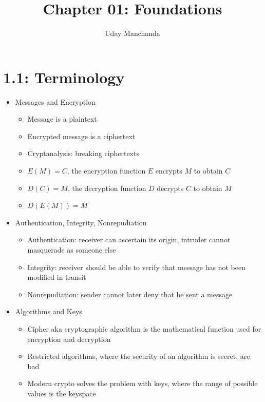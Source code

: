 \documentclass[]{article}
\title{Chapter 01: Foundations}
\author{Uday Manchanda}
\begin{document}
\maketitle

\begin{abstract}
\end{abstract}

\section{1.1: Terminology}
\begin{itemize}
    \item Messages and Encryption
    \begin{itemize}
        \item Message is a plaintext
        \item Encrypted message is a ciphertext
        \item Cryptanalysis: breaking ciphertexts
        \item $E(M) = C$, the encryption function $E$ encrypts $M$ to obtain $C$
        \item $D(C) = M$, the decryption function $D$ decrypts $C$ to obtain $M$
        \item $D(E(M)) = M$
    \end{itemize}
    \item Authentication, Integrity, Nonrepudiation
    \begin{itemize}
        \item Authentication: receiver can ascertain its origin, intruder cannot masquerade as someone else
        \item Integrity: receiver should be able to verify that message has not been modified in transit
        \item Nonrepudiation: sender cannot later deny that he sent a message
    \end{itemize}
    \item Algorithms and Keys
    \begin{itemize}
        \item Cipher aka cryptographic algorithm is the mathematical function used for encryption and decryption
        \item Restricted algorithms, where the security of an algorithm is secret, are bad
        \item Modern crypto solves the problem with keys, where the range of possible values is the keyspace

\end{itemize}
\end{itemize}
\end{document}
